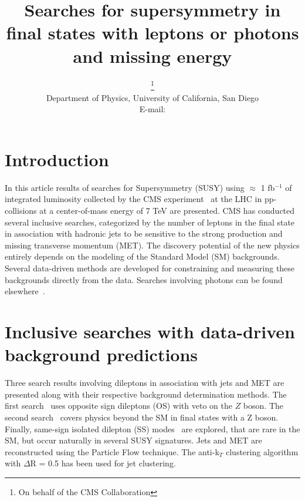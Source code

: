 \documentclass{PoS}
\title{Searches for supersymmetry in final states with leptons or photons and missing energy}
\author{\speaker{Sanjay Padhi}\thanks{On behalf of the CMS Collaboration}\\
        Department of Physics, University of California, San Diego\\
        E-mail: \email{Sanjay.Padhi@cern.ch}}
\begin{document}
\section{Introduction}
In this article results of searches for Supersymmetry (SUSY) using $\approx$ 1 fb$^{-1}$ of integrated luminosity 
collected by the CMS experiment~\cite{bib:cms} at the LHC in pp-collisions at a center-of-mass energy of 7 TeV are presented. CMS 
has conducted several inclusive searches, categorized by the number of leptons in the
final state in association with hadronic jets to be sensitive to the strong production and missing transverse momentum (MET). 
The discovery potential of the new physics entirely depends on the modeling of the Standard Model (SM) backgrounds. 
Several data-driven methods are developed for constraining and measuring these backgrounds directly from the data. 
Searches involving photons can be found elsewhere~\cite{bib:public}.
\section{Inclusive searches with data-driven background predictions}
Three search results involving dileptons in association with jets and MET are presented along with their respective background determination methods. The first search~\cite{bib:os} 
uses opposite sign dileptons (OS) with veto on the $Z$ boson. The second search~\cite{bib:osz1, bib:osz2} covers physics beyond the SM in final states with a Z boson. 
Finally, same-sign isolated dilepton (SS) modes~\cite{bib:ss} are explored, that are rare in the SM, but occur naturally in several SUSY signatures. 
Jets and MET are reconstructed using the Particle Flow technique. The anti-k$_T$ clustering algorithm with $\Delta$R = 0.5 has been used for jet clustering.
\end{document}
